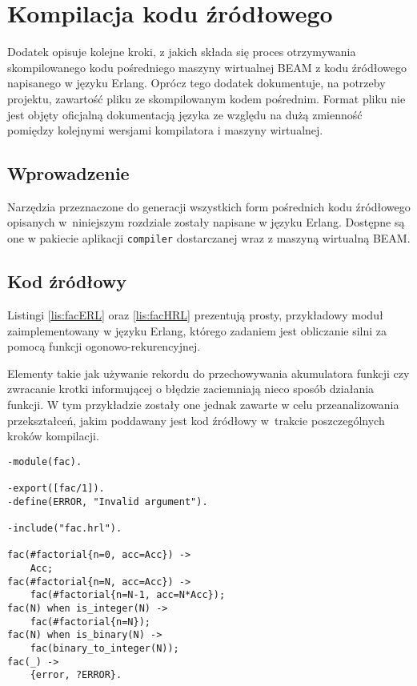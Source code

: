 \chapter{Kompilacja kodu źródłowego}
\label{cha:erlangKompilacja}

Dodatek opisuje kolejne kroki, z jakich składa się proces otrzymywania skompilowanego kodu pośredniego maszyny wirtualnej BEAM z kodu źródłowego napisanego w języku Erlang.
Oprócz tego dodatek dokumentuje, na potrzeby projektu, zawartość pliku ze skompilowanym kodem pośrednim.  Format pliku nie jest objęty oficjalną dokumentacją języka ze względu na dużą zmienność pomiędzy kolejnymi wersjami kompilatora i maszyny wirtualnej.

\section{Wprowadzenie}

Narzędzia przeznaczone do generacji wszystkich form pośrednich kodu źródłowego opisanych w~niniejszym rozdziale zostały napisane w języku Erlang. Dostępne są one w pakiecie aplikacji \texttt{compiler} dostarczanej wraz z maszyną wirtualną BEAM.

\section{Kod źródłowy}

Listingi \ref{lis:facERL} oraz \ref{lis:facHRL} prezentują prosty, przykładowy moduł zaimplementowany w języku Erlang, którego zadaniem jest obliczanie silni za pomocą funkcji ogonowo-rekurencyjnej.

Elementy takie jak używanie rekordu do przechowywania akumulatora funkcji czy zwracanie krotki informującej o błędzie zaciemniają nieco sposób działania funkcji. W tym przykładzie zostały one jednak zawarte w celu przeanalizowania przekształceń, jakim poddawany jest kod źródłowy w~trakcie poszczególnych kroków kompilacji.

\begin{lstlisting}[style=erlang, caption=Plik fac.erl, label=lis:facERL]
-module(fac).

-export([fac/1]).
-define(ERROR, "Invalid argument").

-include("fac.hrl").

fac(#factorial{n=0, acc=Acc}) ->
    Acc;
fac(#factorial{n=N, acc=Acc}) ->
    fac(#factorial{n=N-1, acc=N*Acc});
fac(N) when is_integer(N) ->
    fac(#factorial{n=N});
fac(N) when is_binary(N) ->
    fac(binary_to_integer(N));
fac(_) ->
    {error, ?ERROR}.
\end{lstlisting}

